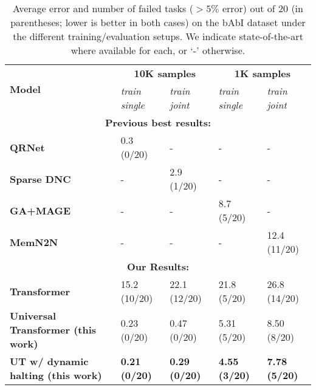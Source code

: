 \begin{table}[t!]
\centering
\begin{adjustbox}{max width=\textwidth}
\begin{tabular}{lllll}
& & & & \\ \toprule
\multirow{2}{*}{ \bf Model } & \multicolumn{2}{c}{ \bf 10K samples } & \multicolumn{2}{c}{ \bf 1K samples } \\ \cmidrule{2-5}
& \textit{train single} & \textit{train joint} & \textit{train single} & \textit{train joint} \\ \midrule
\multicolumn{5}{c}{\bf Previous best results:} \\ \midrule
\bf QRNet~\citep{seo2016query} & 0.3 (0/20) & - & - & - \\
\bf Sparse DNC~\citep{rae2016scaling} & - & 2.9 (1/20) & - & - \\
\bf GA+MAGE~\cite{dhingra2017linguistic} & - & - & 8.7 (5/20) & - \\
\bf MemN2N~\cite{sukhbaatar2015} & - & - & -  & 12.4 (11/20) \\\midrule
\multicolumn{5}{c}{\bf Our Results:} \\ \midrule
\bf Transformer~\citep{transformer} & 15.2 (10/20) & 22.1 (12/20) & 21.8 (5/20) & 26.8 (14/20) \\
\bf Universal Transformer (this work) & 0.23 (0/20) & 0.47 (0/20) & 5.31 (5/20) & 8.50 (8/20) \\
\bf UT w/ dynamic halting (this work) & {\bf 0.21 (0/20)} & {\bf 0.29 (0/20)} & {\bf 4.55 (3/20)} & {\bf 7.78 (5/20)} \\ \bottomrule
\end{tabular}
\end{adjustbox}
\caption{Average error and number of failed tasks ($> 5\%$ error) out of 20 (in parentheses; lower is better in both cases) on the bAbI dataset under the different training/evaluation setups. We indicate state-of-the-art where available for each, or `-' otherwise.}
\label{tab:babi-results}
\end{table}